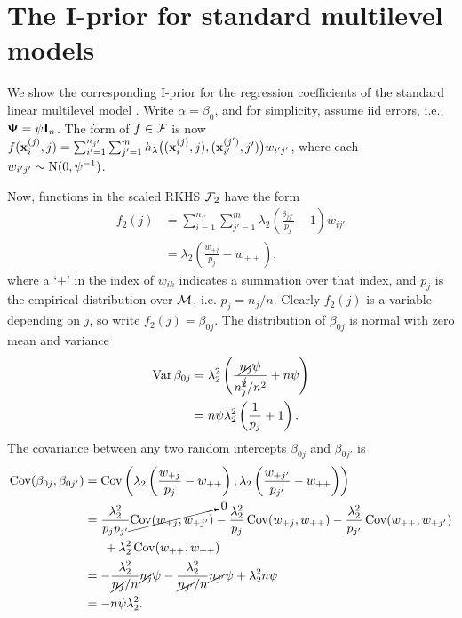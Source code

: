\section{The I-prior for standard multilevel models}
\label{misc:multilevelmodels}

We show the corresponding I-prior for the regression coefficients of the standard linear multilevel model .
Write $\alpha=\beta_0$, and for simplicity, assume iid errors, i.e.,  ${\bm\Psi} = \psi{\mathbf I}_n$.
The form of $f\in{\mathcal F}$ is now $f({\mathbf x}_i^{(j)},j) = \sum_{i'=1}^{n_{j'}}\sum_{j'=1}^m h_\lambda\big(({\mathbf x}_i^{(j)},j),({\mathbf x}_{i'}^{(j')},j')\big) w_{i'j'}$, where each $w_{i'j'}\sim\operatorname{N}(0,\psi^{-1})$.

Now, functions in the scaled RKHS ${\mathcal F}_2$ have the form
\begin{align*}
  f_2(j) 
  &= \sum_{i=1}^{n_{j'}}\sum_{j'=1}^m \lambda_2\left( \frac{\delta_{jj'}}{p_j} - 1 \right)w_{ij'} \\
  &=  \lambda_2\left( \frac{w_{+j}}{p_j} - w_{++} \right),
\end{align*}
where a `$+$' in the index of $w_{ik}$ indicates a summation over that index, and $p_j$ is the empirical distribution over ${\mathcal M}$, i.e. $p_j = n_j/n$.
Clearly $f_2(j)$ is a variable depending on $j$, so write $f_2(j)=\beta_{0j}$.
The distribution of $\beta_{0j}$ is normal with zero mean and variance
\begin{align*}
  \operatorname{Var} \beta_{0j} 
  &= \lambda_2^2 \left( \frac{\cancel{n_j}\psi}{n_j^{\cancel{2}} / n^2} + n\psi \right)  \\
  &= n\psi\lambda_2^2 \left( \frac{1}{p_j} + 1 \right).
\end{align*}
The covariance between any two random intercepts $\beta_{0j}$ and $\beta_{0j'}$ is
\begin{align*}
  \operatorname{Cov}(\beta_{0j},\beta_{0j'})
  &= \operatorname{Cov}\left( \lambda_2\left( \frac{w_{+j}}{p_j} - w_{++} \right), \lambda_2\left( \frac{w_{+j'}}{p_{j'}} - w_{++} \right) \right)  \\
  &= \frac{\lambda_2^2}{p_j p_{j'}} \cancelto{0}{\operatorname{Cov}(w_{+j},w_{+j'})} - \frac{\lambda_2^2}{p_j} \operatorname{Cov}(w_{+j},w_{++}) - \frac{\lambda_2^2}{p_{j'}} \operatorname{Cov}(w_{++},w_{+j'}) \\
  &\phantom{==} + \lambda_2^2 \operatorname{Cov}(w_{++},w_{++}) \\
  &= - \frac{\lambda_2^2}{\cancel{n_j}/n} \cancel{n_j}\psi - \frac{\lambda_2^2}{\cancel{n_{j'}}/n} \cancel{n_{j'}}\psi + \lambda_2^2 n\psi \\
  &= -n\psi\lambda_2^2.
\end{align*}


